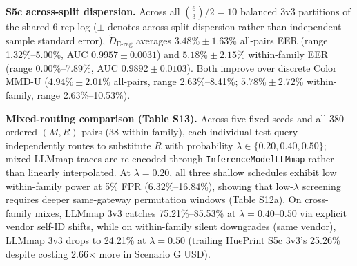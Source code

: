 \documentclass[10pt,letterpaper]{article}
\theoremstyle{definition}
\newcommand{\Dereg}{\tilde D_{\mathrm{E\mbox{-}reg}}}
\begin{document}
\textbf{S5c across-split dispersion.} Across all $\binom{6}{3}/2 = 10$ balanced 3v3 partitions of the shared 6-rep log ($\pm$ denotes across-split dispersion rather than independent-sample standard error), $\Dereg{}$ averages $3.48\% \pm 1.63\%$ all-pairs EER (range 1.32\%--5.00\%, AUC $0.9957 \pm 0.0031$) and $5.18\% \pm 2.15\%$ within-family EER (range 0.00\%--7.89\%, AUC $0.9892 \pm 0.0103$). Both improve over discrete Color MMD-U ($4.94\% \pm 2.01\%$ all-pairs, range 2.63\%--8.41\%; $5.78\% \pm 2.72\%$ within-family, range 2.63\%--10.53\%).


\textbf{Mixed-routing comparison (Table S13).} Across five fixed seeds and all 380 ordered $(M, R)$ pairs (38 within-family), each individual test query independently routes to substitute $R$ with probability $\lambda \in \{0.20, 0.40, 0.50\}$; mixed LLMmap traces are re-encoded through \texttt{InferenceModelLLMmap} rather than linearly interpolated. At $\lambda=0.20$, all three shallow schedules exhibit low within-family power at 5\% FPR (6.32\%--16.84\%), showing that low-$\lambda$ screening requires deeper same-gateway permutation windows (Table S12a). On cross-family mixes, LLMmap 3v3 catches 75.21\%--85.53\% at $\lambda=0.40\text{--}0.50$ via explicit vendor self-ID shifts, while on within-family silent downgrades (same vendor), LLMmap 3v3 drops to 24.21\% at $\lambda=0.50$ (trailing HuePrint S5c 3v3's 25.26\% despite costing 2.66\ensuremath{\times} more in Scenario G USD).
\end{document}
